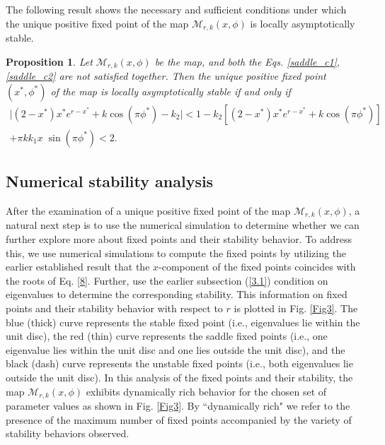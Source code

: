 \documentclass{article}
\newtheorem{proposition}[theorem]{Proposition}
\begin{document}
\noindent The following result shows the necessary and sufficient conditions under which the unique positive fixed point of the map $\mathcal{M}_{r,k}(x,\phi)$ is locally asymptotically stable.

\begin{proposition}
Let $\mathcal{M}_{r,k}(x,\phi)$ be the map, and both the Eqs. \eqref{saddle_c1}, \eqref{saddle_c2} are not satisfied together. Then the unique positive fixed point $(x^*,\phi^*)$  of the map is locally asymptotically stable if and only if 
   \begin{equation}
   \begin{split}   
       \lvert (2-x^{*})x^{*}e^{r-x^{*}}+k \cos(\pi\phi^*)-k_2 \rvert <1-k_2[(2-x^{*})x^{*}e^{r-x^{*}} +k \cos(\pi\phi^*)]\\+{\pi}k{k_1}x\;\sin({\pi}\phi^*)<2.
    \end{split}
   \end{equation}    
\end{proposition}


\subsection{Numerical stability analysis}

After the examination of a unique positive fixed point of the map $\mathcal{M}_{r,k}(x,\phi)$, a natural next step is to use the numerical simulation to determine whether we can further explore more about fixed points and their stability behavior. To address this, we use numerical simulations to compute the fixed points by utilizing the earlier established result that the $x$-component of the fixed points coincides with the roots of Eq. \eqref{8}. Further, use the earlier subsection (\ref{3.1}) condition on eigenvalues to determine the corresponding stability. This information on fixed points and their stability behavior with respect to $r$ is plotted in Fig. \ref{Fig3}. The blue (thick) curve represents the stable fixed point (i.e., eigenvalues lie within the unit disc), the red (thin) curve represents the saddle fixed points (i.e., one eigenvalue lies within the unit disc and one lies outside the unit disc), and the black (dash) curve represents the unstable fixed points (i.e., both eigenvalues lie outside the unit disc). In this analysis of the fixed points and their stability, the map $\mathcal{M}_{r,k}(x,\phi)$ exhibits dynamically rich behavior for the chosen set of parameter values as shown in Fig. \ref{Fig3}. By ``dynamically rich" we refer to the presence of the maximum number of fixed points accompanied by the variety of stability behaviors observed.  
\end{document}
